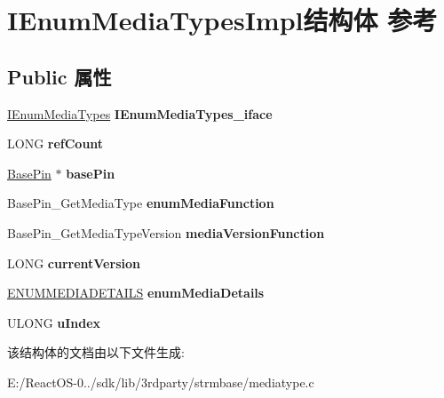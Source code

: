 \hypertarget{struct_i_enum_media_types_impl}{}\section{I\+Enum\+Media\+Types\+Impl结构体 参考}
\label{struct_i_enum_media_types_impl}
\subsection*{Public 属性}
\begin{DoxyCompactItemize}
\item 
\mbox{\label{struct_i_enum_media_types_impl_acf6d19487ad96c78e700edd3307ead9c}} 
\hyperlink{interface_i_enum_media_types}{I\+Enum\+Media\+Types} {\bfseries I\+Enum\+Media\+Types\+\_\+iface}
\item 
\mbox{\label{struct_i_enum_media_types_impl_a13a1a86cd8a5f49a770055c9aadb628a}} 
L\+O\+NG {\bfseries ref\+Count}
\item 
\mbox{\label{struct_i_enum_media_types_impl_ac69809b8a23dbbff723d89de82ab4f40}} 
\hyperlink{struct_base_pin}{Base\+Pin} $\ast$ {\bfseries base\+Pin}
\item 
\mbox{\label{struct_i_enum_media_types_impl_a06c0aaef9a13f65bf1ef8b6a59bf72e6}} 
Base\+Pin\+\_\+\+Get\+Media\+Type {\bfseries enum\+Media\+Function}
\item 
\mbox{\label{struct_i_enum_media_types_impl_a8578315a4ed920677ef0b88b1af92dcb}} 
Base\+Pin\+\_\+\+Get\+Media\+Type\+Version {\bfseries media\+Version\+Function}
\item 
\mbox{\label{struct_i_enum_media_types_impl_af6e3c6ffd106928224d72df657f7e697}} 
L\+O\+NG {\bfseries current\+Version}
\item 
\mbox{\label{struct_i_enum_media_types_impl_ab1b0b4c424261d6e5367857c3892c7bf}} 
\hyperlink{structtag_e_n_u_m_e_d_i_a_d_e_t_a_i_l_s}{E\+N\+U\+M\+M\+E\+D\+I\+A\+D\+E\+T\+A\+I\+LS} {\bfseries enum\+Media\+Details}
\item 
\mbox{\label{struct_i_enum_media_types_impl_aadf1ab8b0b074bc3bfb2da1db63697a6}} 
U\+L\+O\+NG {\bfseries u\+Index}
\end{DoxyCompactItemize}


该结构体的文档由以下文件生成\+:\begin{DoxyCompactItemize}
\item 
E\+:/\+React\+O\+S-\/0../sdk/lib/3rdparty/strmbase/mediatype.\+c\end{DoxyCompactItemize}
